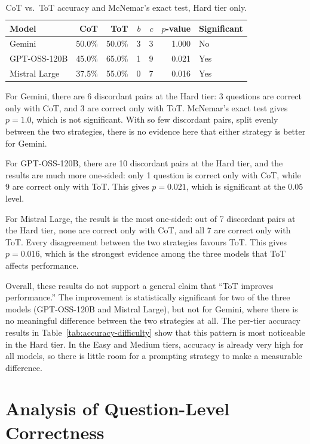 \begin{table}[H]
  \centering
  \caption{CoT vs.\ ToT accuracy and McNemar's exact test, Hard tier only.}
  \label{tab:cot-tot-hard}
  \begin{tabular}{lrrrrrl}
    \toprule
    Model & CoT & ToT & $b$ & $c$ & $p$-value & Significant \\
    \midrule
    Gemini & 50.0\% & 50.0\% & 3 & 3 & 1.000 & No \\
    GPT-OSS-120B & 45.0\% & 65.0\% & 1 & 9 & 0.021 & Yes \\
    Mistral Large & 37.5\% & 55.0\% & 0 & 7 & 0.016 & Yes \\
    \bottomrule
  \end{tabular}
\end{table}

For Gemini, there are 6 discordant pairs at the Hard tier: 3 questions
are correct only with CoT, and 3 are correct only with ToT. McNemar's
exact test gives $p = 1.0$, which is not significant. With so few
discordant pairs, split evenly between the two strategies, there is no
evidence here that either strategy is better for Gemini.

For GPT-OSS-120B, there are 10 discordant pairs at the Hard tier, and
the results are much more one-sided: only 1 question is correct only
with CoT, while 9 are correct only with ToT. This gives $p = 0.021$,
which is significant at the 0.05 level.

For Mistral Large, the result is the most one-sided: out of 7 discordant
pairs at the Hard tier, none are correct only with CoT, and all 7 are
correct only with ToT. Every disagreement between the two strategies
favours ToT. This gives $p = 0.016$, which is the strongest evidence
among the three models that ToT affects performance.

Overall, these results do not support a general claim that ``ToT
improves performance.'' The improvement is statistically significant for
two of the three models (GPT-OSS-120B and Mistral Large), but not for
Gemini, where there is no meaningful difference between the two
strategies at all. The per-tier accuracy results in
Table~\ref{tab:accuracy-difficulty} show that this pattern is most
noticeable in the Hard tier. In the Easy and Medium tiers, accuracy is
already very high for all models, so there is little room for a
prompting strategy to make a measurable difference.

\section{Analysis of Question-Level Correctness}
\label{sec:question-correctness}

